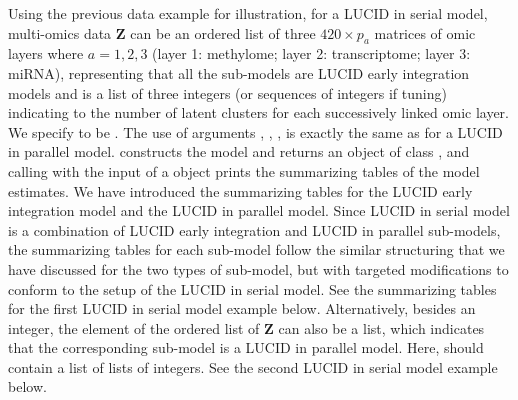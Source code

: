 Using the previous data example for illustration, for a LUCID in serial model, multi-omics data $\bm Z$ can be an ordered list of three $420 \times p_a$ matrices of omic layers where $a = 1, 2, 3$ (layer 1: methylome; layer 2: transcriptome; layer 3: miRNA), representing that all the sub-models are LUCID early integration models and  is a list of three integers (or sequences of integers if tuning) indicating to the number of latent clusters for each successively linked omic layer. We specify  to be . The use of arguments , , ,  is exactly the same as for a LUCID in parallel model.  constructs the model and returns an object of class , and calling  with the input of a  object prints the summarizing tables of the model estimates. We have introduced the summarizing tables for the LUCID early integration model and the LUCID in parallel model. Since LUCID in serial model is a combination of LUCID early integration and LUCID in parallel sub-models, the summarizing tables for each sub-model follow the similar structuring that we have discussed for the two types of sub-model, but with targeted modifications to conform to the setup of the LUCID in serial model. See the summarizing tables for the first LUCID in serial model example below. Alternatively, besides an integer, the element of the ordered list of $\bm Z$ can also be a list, which indicates that the corresponding sub-model is a LUCID in parallel model. Here,  should contain a list of lists of integers. See the second LUCID in serial model example below. 
